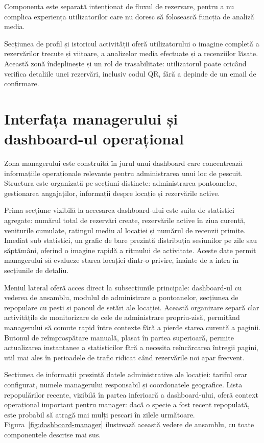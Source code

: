 Componenta este separată intenționat de fluxul de rezervare, pentru a nu complica experiența utilizatorilor care nu doresc să folosească funcția de analiză media.

Secțiunea de profil și istoricul activității oferă utilizatorului o imagine completă a rezervărilor trecute și viitoare, a analizelor media efectuate și a recenziilor lăsate. Această zonă îndeplinește și un rol de trasabilitate: utilizatorul poate oricând verifica detaliile unei rezervări, inclusiv codul QR, fără a depinde de un email de confirmare.

\section{Interfața managerului și dashboard-ul operațional}

Zona managerului este construită în jurul unui dashboard care concentrează informațiile operaționale relevante pentru administrarea unui loc de pescuit. Structura este organizată pe secțiuni distincte: administrarea pontoanelor, gestionarea angajaților, informații despre locație și rezervările active.

Prima secțiune vizibilă la accesarea dashboard-ului este suita de statistici agregate: numărul total de rezervări create, rezervările active în ziua curentă, veniturile cumulate, ratingul mediu al locației și numărul de recenzii primite. Imediat sub statistici, un grafic de bare prezintă distribuția sesiunilor pe zile sau săptămâni, oferind o imagine rapidă a ritmului de activitate. Aceste date permit managerului să evalueze starea locației dintr-o privire, înainte de a intra în secțiunile de detaliu.

Meniul lateral oferă acces direct la subsecțiunile principale: dashboard-ul cu vederea de ansamblu, modulul de administrare a pontoanelor, secțiunea de repopulare cu pești și panoul de setări ale locației. Această organizare separă clar activitățile de monitorizare de cele de administrare propriu-zisă, permițând managerului să comute rapid între contexte fără a pierde starea curentă a paginii. Butonul de reîmprospătare manuală, plasat în partea superioară, permite actualizarea instantanee a statisticilor fără a necesita reîncărcarea întregii pagini, util mai ales în perioadele de trafic ridicat când rezervările noi apar frecvent.

Secțiunea de informații prezintă datele administrative ale locației: tariful orar configurat, numele managerului responsabil și coordonatele geografice. Lista repopulărilor recente, vizibilă în partea inferioară a dashboard-ului, oferă context operațional important pentru manager: dacă o specie a fost recent repopulată, este probabil să atragă mai mulți pescari în zilele următoare. Figura~\ref{fig:dashboard-manager} ilustrează această vedere de ansamblu, cu toate componentele descrise mai sus.

